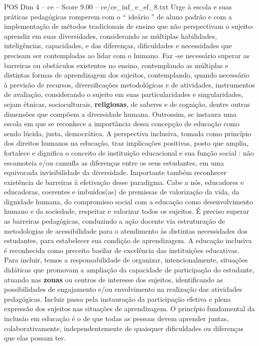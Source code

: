 \begin{textsample}{POS Dim 4 – ce – Score 9.00 – ce/ce\_inf\_e\_ef\_8.txt}
Urge à escola e suas práticas pedagógicas romperem com o “ ideário ” de aluno padrão e com a implementação de métodos tradicionais de ensino que não perspectivam o sujeito-aprendiz em suas diversidades, considerando as múltiplas habilidades, inteligências, capacidades, e das diferenças, dificuldades e necessidades que precisam ser contempladas ao lidar com o humano.
Faz -se necessário superar as barreiras ou obstáculos existentes no ensino, contemplando as múltiplas e distintas formas de aprendizagem dos sujeitos, contemplando, quando necessário à previsão de recursos, diversificações metodológicas e de atividades, instrumentos de avaliação, considerando o sujeito em suas particularidades e singularidades, sejam étnicas, socioculturais, \textbf{religiosas}, de saberes e de cognição, dentre outras dimensões que compõem a diversidade humana.
Outrossim, se instaura uma escola em que se reconhece a importância dessa concepção de educação como sendo lúcida, justa, democrática.
A perspectiva inclusiva, tomada como princípio dos direitos humanos na educação, traz implicações positivas, posto que amplia, fortalece e dignifica o conceito de instituição educacional e sua função social : não escamoteia e/ou camufla as diferenças entre os seus estudantes, em uma equivocada invisibilidade da diversidade.
Importante também reconhecer existência de barreiras à efetivação desse paradigma.
Cabe a nós, educadores e educadoras, coerentes e imbuídos(as) de premissas de valorização da vida, da dignidade humana, do compromisso social com a educação como desenvolvimento humano e da sociedade, respeitar e valorizar todos os sujeitos.
É preciso superar as barreiras pedagógicas, conduzindo a ação docente via estruturação de metodologias de acessibilidade para o atendimento às distintas necessidades dos estudantes, para estabelecer sua condição de aprendizagem.
A educação inclusiva é reconhecida como preceito basilar de excelência das instituições educativas.
Para incluir, temos a responsabilidade de organizar, intencionalmente, situações didáticas que promovam a ampliação da capacidade de participação do estudante, atuando nas \textbf{zonas} ou centros de interesse dos sujeitos, identificando as possibilidades de engajamento e/ou envolvimento na realização das atividades pedagógicas.
Incluir passa pela instauração da participação efetiva e plena expressão dos sujeitos nas situações de aprendizagem.
O princípio fundamental da inclusão em educação é o de que todas as pessoas devem aprender juntas, colaborativamente, independentemente de quaisquer dificuldades ou diferenças que elas possam ter.

\end{textsample}
